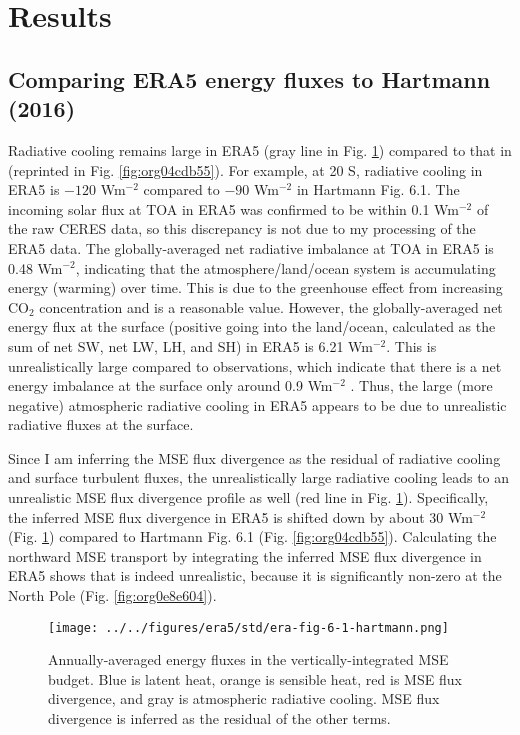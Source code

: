 \documentclass[11pt]{article}
\begin{document}
\section{Results}
\label{sec:orgcb2ee01}
\subsection{Comparing ERA5 energy fluxes to Hartmann (2016)}
\label{sec:org3a05cf2}
Radiative cooling remains large in ERA5 (gray line in Fig. \ref{fig:orga68063a}) compared to that in \cite{hartmann_global_2016} (reprinted in Fig. \ref{fig:org04cdb55}). For example, at 20 S, radiative cooling in ERA5 is \(-120\) Wm\(^{-2}\) compared to \(-90\) Wm\(^{-2}\) in Hartmann Fig. 6.1. The incoming solar flux at TOA in ERA5 was confirmed to be within 0.1 Wm\(^{-2}\) of the raw CERES data, so this discrepancy is not due to my processing of the ERA5 data. The globally-averaged net radiative imbalance at TOA in ERA5 is 0.48 Wm\(^{-2}\), indicating that the atmosphere/land/ocean system is accumulating energy (warming) over time. This is due to the greenhouse effect from increasing CO\(_2\) concentration and is a reasonable value. However, the globally-averaged net energy flux at the surface (positive going into the land/ocean, calculated as the sum of net SW, net LW, LH, and SH) in ERA5 is 6.21 Wm\(^{-2}\). This is unrealistically large compared to observations, which indicate that there is a net energy imbalance at the surface only around 0.9 Wm\(^{-2}\) \cite{trenberth_earths_2009}. Thus, the large (more negative) atmospheric radiative cooling in ERA5 appears to be due to unrealistic radiative fluxes at the surface.

Since I am inferring the MSE flux divergence as the residual of radiative cooling and surface turbulent fluxes, the unrealistically large radiative cooling leads to an unrealistic MSE flux divergence profile as well (red line in Fig. \ref{fig:orga68063a}). Specifically, the inferred MSE flux divergence in ERA5 is shifted down by about 30 Wm\(^{-2}\) (Fig. \ref{fig:orga68063a}) compared to Hartmann Fig. 6.1 (Fig. \ref{fig:org04cdb55}). Calculating the northward MSE transport by integrating the inferred MSE flux divergence in ERA5 shows that is indeed unrealistic, because it is significantly non-zero at the North Pole (Fig. \ref{fig:org0e8e604}).

\begin{figure}[htbp]
\centering
\texttt{[image: ../../figures/era5/std/era-fig-6-1-hartmann.png]}
\caption{\label{fig:orga68063a}Annually-averaged energy fluxes in the vertically-integrated MSE budget. Blue is latent heat, orange is sensible heat, red is MSE flux divergence, and gray is atmospheric radiative cooling. MSE flux divergence is inferred as the residual of the other terms.}
\end{figure}
\end{document}
